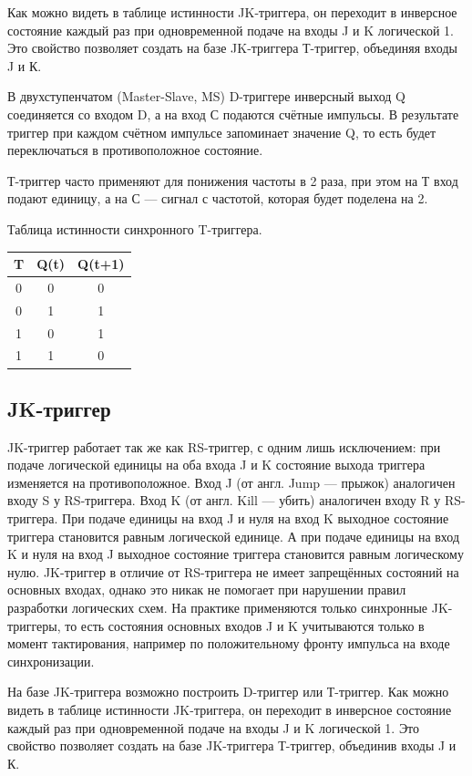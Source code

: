 \documentclass[unicode, 12pt, a4paper, oneside]{article}
\begin{document}
Как можно видеть в таблице истинности JK-триггера, он переходит в инверсное состояние каждый раз при одновременной подаче на входы J и K логической 1. Это свойство позволяет создать на базе JK-триггера Т-триггер, объединяя входы J и К.

В двухступенчатом (Master-Slave, MS) D-триггере инверсный выход Q соединяется со входом D, а на вход С подаются счётные импульсы. В результате триггер при каждом счётном импульсе запоминает значение Q, то есть будет переключаться в противоположное состояние.

Т-триггер часто применяют для понижения частоты в 2 раза, при этом на Т вход подают единицу, а на С — сигнал с частотой, которая будет поделена на 2.

Таблица истинности синхронного T-триггера.

\begin{tabular}{|c|c|c|}
\hline	T	& Q(t)	& Q(t+1)	\\
\hline	0	& 0		& 0			\\
\hline	0	& 1		& 1			\\
\hline	1	& 0		& 1			\\
\hline	1	& 1		& 0			\\
\hline
\end{tabular}

\subsection*{JK-триггер}

JK-триггер работает так же как RS-триггер, с одним лишь исключением: при подаче логической единицы на оба входа J и K состояние выхода триггера изменяется на противоположное. Вход J (от англ. Jump — прыжок) аналогичен входу S у RS-триггера. Вход K (от англ. Kill — убить) аналогичен входу R у RS-триггера. При подаче единицы на вход J и нуля на вход K выходное состояние триггера становится равным логической единице. А при подаче единицы на вход K и нуля на вход J выходное состояние триггера становится равным логическому нулю. JK-триггер в отличие от RS-триггера не имеет запрещённых состояний на основных входах, однако это никак не помогает при нарушении правил разработки логических схем. На практике применяются только синхронные JK-триггеры, то есть состояния основных входов J и K учитываются только в момент тактирования, например по положительному фронту импульса на входе синхронизации.

На базе JK-триггера возможно построить D-триггер или Т-триггер. Как можно видеть в таблице истинности JK-триггера, он переходит в инверсное состояние каждый раз при одновременной подаче на входы J и K логической 1. Это свойство позволяет создать на базе JK-триггера Т-триггер, объединив входы J и К.
\end{document}
